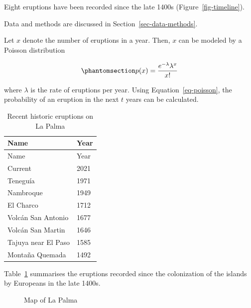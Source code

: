 \documentclass[11pt,a4paper]{report}
\begin{document}
Eight eruptions have been recorded since the late 1400s
(Figure~\ref{fig-timeline}).

Data and methods are discussed in Section~\ref{sec-data-methods}.

Let \(x\) denote the number of eruptions in a year. Then, \(x\) can be
modeled by a Poisson distribution

\begin{equation}\phantomsection\label{eq-poisson}{
p(x) = \frac{e^{-\lambda} \lambda^{x}}{x !}
}\end{equation}

where \(\lambda\) is the rate of eruptions per year. Using
Equation~\ref{eq-poisson}, the probability of an eruption in the next
\(t\) years can be calculated.

\begin{longtable}[]{@{}ll@{}}
\caption{Recent historic eruptions on La
Palma}\label{tbl-history}\tabularnewline
\toprule\noalign{}
Name & Year \\
\midrule\noalign{}
\endfirsthead
\toprule\noalign{}
Name & Year \\
\midrule\noalign{}
\endhead
\bottomrule\noalign{}
\endlastfoot
Current & 2021 \\
Teneguía & 1971 \\
Nambroque & 1949 \\
El Charco & 1712 \\
Volcán San Antonio & 1677 \\
Volcán San Martin & 1646 \\
Tajuya near El Paso & 1585 \\
Montaña Quemada & 1492 \\
\end{longtable}

Table~\ref{tbl-history} summarises the eruptions recorded since the
colonization of the islands by Europeans in the late 1400s.

\begin{figure}


\caption{\label{fig-map}Map of La Palma}

\end{figure}%
\end{document}
